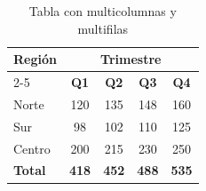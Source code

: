 \begin{table}
\centering
\begin{tabularx}{\linewidth}{|X|c|c|c|c|}
\hline
\multirow{2}{*}{\textbf{Región}} & \multicolumn{4}{c|}{\textbf{Trimestre}} \\
\cline{2-5}
                  & \textbf{Q1} & \textbf{Q2} & \textbf{Q3} & \textbf{Q4} \\
\hline
Norte             & 120 & 135 & 148 & 160 \\
Sur               & 98  & 102 & 110 & 125 \\
Centro            & 200 & 215 & 230 & 250 \\
\hline
\textbf{Total}    & \textbf{418} & \textbf{452} & \textbf{488} & \textbf{535} \\
\hline
\end{tabularx}
\caption{Tabla con multicolumnas y multifilas}
\end{table}
